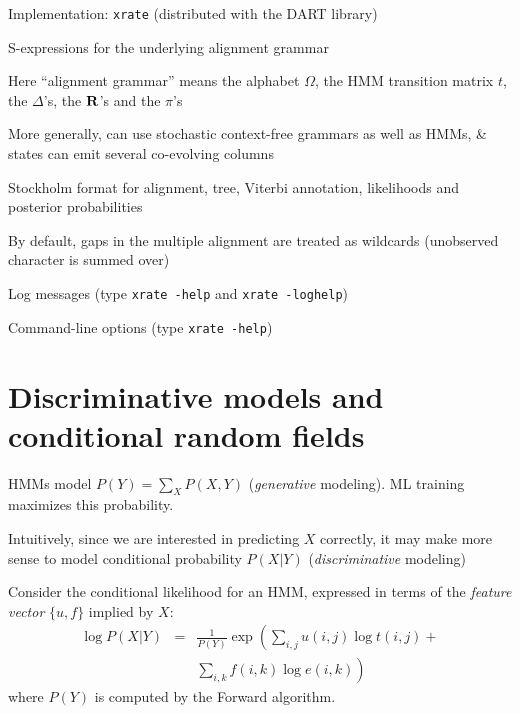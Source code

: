\documentclass{beamer}
\begin{document}
\begin{frame}
\itemb
\item Implementation: {\tt xrate} (distributed with the DART library)
 \itemb
 \item S-expressions for the underlying alignment grammar
  \itemb
  \item Here ``alignment grammar'' means the alphabet $\Omega$, the HMM transition matrix $t$, the $\Delta$'s, the ${\bf R}$'s and the $\pi$'s
  \item More generally, can use stochastic context-free grammars as well as HMMs, \& states can emit several co-evolving columns
  \iteme
 \item Stockholm format for alignment, tree, Viterbi annotation, likelihoods and posterior probabilities
 \item By default, gaps in the multiple alignment are treated as wildcards (unobserved character is summed over)
 \item Log messages (type {\tt xrate -help} and {\tt xrate -loghelp})
 \item Command-line options (type {\tt xrate -help})
 \iteme
\iteme

\end{frame}

\section{Discriminative models and conditional random fields}
\label{sec:DiscriminativeHMMs}

\begin{frame}{}

\itemb
\item HMMs model $P(Y) = \sum_X P(X,Y)$ ({\em generative} modeling). ML training maximizes this probability.
\item Intuitively, since we are interested in predicting $X$ correctly, it may make more sense to model conditional probability $P(X|Y)$ ({\em discriminative} modeling)
\item Consider the conditional likelihood for an HMM, expressed in terms of the {\em feature vector} $\{u,f\}$ implied by $X$:
\begin{eqnarray*}
\log P(X|Y) & = & \frac{1}{P(Y)} \exp \left( \sum_{i,j} u(i,j) \log t(i,j) + \right. \\ & & \left. \sum_{i,k} f(i,k) \log e(i,k) \right)
\end{eqnarray*}
where $P(Y)$ is computed by the Forward algorithm.
\iteme
\end{frame}
\end{document}
